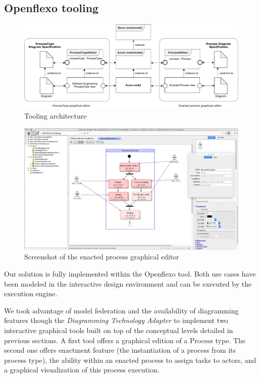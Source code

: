 \subsection{Openflexo tooling}
\label{subsec:tooling}

\begin{figure}
 \centering
     \includegraphics[width=0.9 \textwidth]{Figures/ToolingArchitecture.pdf}
     \caption{Tooling architecture}
    \label{fig:ToolingArchitecture}
\end{figure}

\begin{figure}
 \centering
     \includegraphics[width=\textwidth]{Figures/ScreenshotEnactedProcessEditor.png}
     \caption{Screenshot of the enacted process graphical editor}
    \label{fig:ScreenshotEnactedProcessEditor}
\end{figure}

Our solution is fully implemented within the Openflexo tool. Both use cases have been modeled in the interactive design environment and can be executed by the \FML execution engine. 


We took advantage of model federation and the availability of diagramming features though the \textit{Diagramming Technology Adapter} to implement two interactive graphical tools built on top of the conceptual levels detailed in previous sections. A first tool offers a graphical edition of a Process type. The second one offers enactment feature (the instantiation of a process from its process type), the ability within an enacted process to assign tasks to actors, and a graphical visualization of this process execution.


